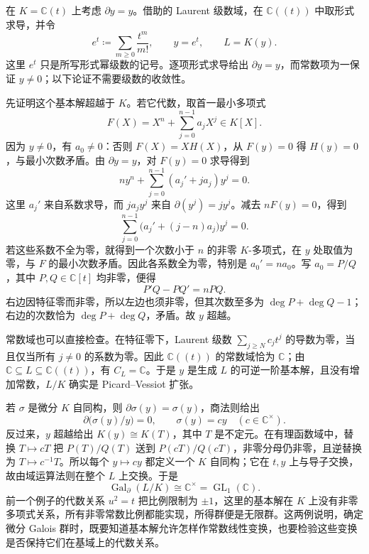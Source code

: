 \begin{example}[超越基本解]\label{b1:exm:D-exponential-extension}
	在 \(K=\mathbb C(t)\) 上考虑 \(\partial y=y\)。借助的 Laurent 级数域，在 \(\mathbb C(\!(t)\!)\) 中取形式求导，并令
	\[
		e^t\coloneqq\sum_{m\geq0}\dfrac{t^m}{m!},\qquad y=e^t,\qquad L=K(y).
	\]
	这里 \(e^t\) 只是所写形式幂级数的记号。逐项形式求导给出 \(\partial y=y\)，而常数项为一保证 \(y\neq0\)；以下论证不需要级数的收敛性。

	先证明这个基本解超越于 \(K\)。若它代数，取首一最小多项式
	\[
		F(X)=X^n+\sum_{j=0}^{n-1}a_jX^j\in K[X].
	\]
	因为 \(y\neq0\)，有 \(a_0\neq0\)：否则 \(F(X)=XH(X)\)，从 \(F(y)=0\) 得 \(H(y)=0\)，与最小次数矛盾。由 \(\partial y=y\)，对 \(F(y)=0\) 求导得到
	\[
		ny^n+\sum_{j=0}^{n-1}(a_j'+ja_j)y^j=0.
	\]
	这里 \(a_j'\) 来自系数求导，而 \(ja_jy^j\) 来自 \(\partial(y^j)=jy^j\)。减去 \(nF(y)=0\)，得到
	\[
		\sum_{j=0}^{n-1}\bigl(a_j'+(j-n)a_j\bigr)y^j=0.
	\]
	若这些系数不全为零，就得到一个次数小于 \(n\) 的非零 \(K\)-多项式，在 \(y\) 处取值为零，与 \(F\) 的最小次数矛盾。因此各系数全为零，特别是 \(a_0'=na_0\)。写 \(a_0=P/Q\)，其中 \(P,Q\in\mathbb C[t]\) 均非零，便得
	\[
		P'Q-PQ'=nPQ.
	\]
	右边因特征零而非零，所以左边也须非零，但其次数至多为 \(\deg P+\deg Q-1\)；右边的次数恰为 \(\deg P+\deg Q\)，矛盾。故 \(y\) 超越。

	常数域也可以直接检查。在特征零下，Laurent 级数 \(\sum_{j\geq N}c_jt^j\) 的导数为零，当且仅当所有 \(j\neq0\) 的系数为零。因此 \(\mathbb C(\!(t)\!)\) 的常数域恰为 \(\mathbb C\)；由 \(\mathbb C\subseteq L\subseteq\mathbb C(\!(t)\!)\)，有 \(C_L=\mathbb C\)。于是 \(y\) 是生成 \(L\) 的可逆一阶基本解，且没有增加常数，\(L/K\) 确实是 Picard--Vessiot 扩张。

	若 \(\sigma\) 是微分 \(K\) 自同构，则 \(\partial\sigma(y)=\sigma(y)\)，商法则给出
	\[
		\partial\bigl(\sigma(y)/y\bigr)=0, \qquad \sigma(y)=cy\quad(c\in\mathbb C^\times).
	\]
	反过来，\(y\) 超越给出 \(K(y)\cong K(T)\)，其中 \(T\) 是不定元。在有理函数域中，替换 \(T\mapsto cT\) 把 \(P(T)/Q(T)\) 送到 \(P(cT)/Q(cT)\)，非零分母仍非零，且逆替换为 \(T\mapsto c^{-1}T\)。所以每个 \(y\mapsto cy\) 都定义一个 \(K\) 自同构；它在 \(t,y\) 上与导子交换，故由域运算法则在整个 \(L\) 上交换。于是
	\[
		\operatorname{Gal}_{\partial}(L/K)\cong\mathbb C^\times =\operatorname{GL}_1(\mathbb C).
	\]
	前一个例子的代数关系 \(u^2=t\) 把比例限制为 \(\pm1\)，这里的基本解在 \(K\) 上没有非零多项式关系，所有非零常数比例都能实现，所得群便是无限群。这两例说明，确定微分 Galois 群时，既要知道基本解允许怎样作常数线性变换，也要检验这些变换是否保持它们在基域上的代数关系。
\end{example}

